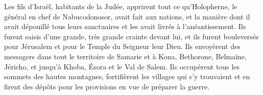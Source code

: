 Les fils d’Israël, habitants de la Judée,
	apprirent tout ce qu’Holopherne, le général en chef de Nabucodonosor,
		avait fait aux nations,
	et la manière dont il avait dépouillé tous leurs sanctuaires
		et les avait livrés à l’anéantissement.
Ils furent saisis d’une grande, très grande crainte devant lui,
	et ils furent bouleversés pour Jérusalem et pour le Temple du Seigneur leur Dieu.
Ils envoyèrent des messagers dans tout le territoire de Samarie
	et à Kona, Bethorone, Belmaïne, Jéricho, et jusqu’à Khoba, Ésora et le Val de Salem.
Ils occupèrent tous les sommets des hautes montagnes,
	fortifièrent les villages qui s’y trouvaient
	et en firent des dépôts pour les provisions en vue de préparer la guerre.
